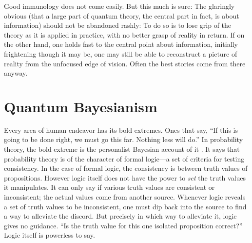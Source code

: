 Good immunology does not come easily.  But this much is sure:  The glaringly obvious (that a large part of quantum theory, the central part in fact, is about information) should not be abandoned rashly:  To do so is to lose grip of the theory as it is applied in practice, with no better grasp of reality in return.  If on the other hand, one holds fast to the central point about information, initially frightening though it may be, one may still be able to reconstruct a picture of reality from the unfocused edge of vision.  Often the best stories come from there anyway.

\section{Quantum Bayesianism}

Every area of human endeavor has its bold extremes.  Ones that say, ``If this is going to be done right, we must go this far.  Nothing less will do.''  In probability theory, the bold extreme is the personalist Bayesian account of it \cite{Bernardo94}.  It says that probability theory is of the character of formal logic---a set of criteria for testing consistency.  In the case of formal logic, the consistency is between truth values of propositions.  However logic itself does not have the power to {\it set\/} the truth values it manipulates.  It can only say if various truth values are consistent or inconsistent; the actual values come from another source.  Whenever logic reveals a set of truth values to be inconsistent, one must dip back into the source to find a way to alleviate the discord.  But precisely in which way to alleviate it, logic gives no guidance.  ``Is the truth value for this one isolated proposition correct?''  Logic itself is powerless to say.

